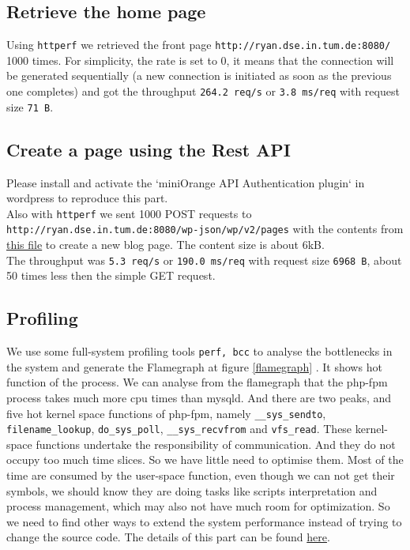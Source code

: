 \subsection{Retrieve the home page}

Using \texttt{httperf} we retrieved the front page \texttt{http://ryan.dse.in.tum.de:8080/} 1000 times. For simplicity, the rate is set to 0, it means that the connection will be generated sequentially (a new connection is initiated as soon as the previous one completes) and got the throughput \texttt{264.2 req/s} or \texttt{3.8 ms/req} with request size \texttt{71 B}.

\subsection{Create a page using the Rest API}

Please install and activate the `miniOrange API Authentication plugin` in wordpress to reproduce this part. \\
Also with \texttt{httperf} we sent 1000 POST requests to \texttt{http://ryan.dse.in.tum.de:8080/wp-json/wp/v2/pages} with the contents from \href{https://github.com/danbachar/swiss-knife/blob/master/task1/benchmark/bench2_content}{this file} to create a new blog page. The content size is about 6kB.\\
The throughput was \texttt{5.3 req/s} or \texttt{190.0 ms/req} with request size \texttt{6968 B}, about 50 times less then the simple GET request.

\subsection{Profiling}
We use some full-system profiling tools \texttt{perf, bcc} to analyse the bottlenecks in the system and generate the Flamegraph at figure \ref{flamegraph} . It shows hot function of the process. We can analyse from the flamegraph that the php-fpm process takes much more cpu times than mysqld. And there are two peaks, and five hot kernel space functions of php-fpm, namely \texttt{\_\_sys\_sendto}, \texttt{filename\_lookup}, \texttt{do\_sys\_poll}, \texttt{\_\_sys\_recvfrom} and \texttt{vfs\_read}. These kernel-space functions undertake the responsibility of communication. And they do not occupy too much time slices. So we have little need to optimise them. Most of the time are consumed by the user-space function, even though we can not get their symbols, we should know they are doing tasks like scripts interpretation and process management, which may also not have much room for optimization. So we need to find other ways to extend the system performance instead of trying to change the source code.
The details of this part can be found \href{https://github.com/danbachar/swiss-knife/blob/master/task1/benchmark/optimization.md}{here}. 


